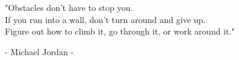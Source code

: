 \text{ }
\vspace{5cm}

\begin{center}\bfseries


"Obstacles don't have to stop you.\\If you run into a wall, don't turn around and give up.\\Figure out how to climb it, go through it, or work around it."



\mdseries

- Michael Jordan -

\end{center}
